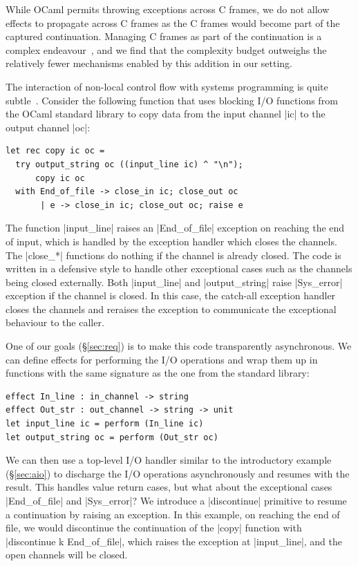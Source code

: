 \documentclass[sigplan,10pt,review,anonymous]{acmart}\settopmatter{printfolios=true,printccs=false,printacmref=false}
\begin{document}
While OCaml permits throwing exceptions across C frames, we do not allow
effects to propagate across C frames as the C frames would become part of the
captured continuation. Managing C frames as part of the continuation is a
complex endeavour~\cite{Leijen17}, and we find that the complexity budget
outweighs the relatively fewer mechanisms enabled by this addition in our
setting.

The interaction of non-local control flow with systems programming is quite
subtle~\cite{TFP17}. Consider the following function that uses blocking I/O
functions from the OCaml standard library to copy data from the input channel
|ic| to the output channel |oc|:
\begin{lstlisting}
let rec copy ic oc =
  try output_string oc ((input_line ic) ^ "\n");
      copy ic oc
  with End_of_file -> close_in ic; close_out oc
	   | e -> close_in ic; close_out oc; raise e
\end{lstlisting}
The function |input_line| raises an |End_of_file| exception on reaching the end
of input, which is handled by the exception handler which closes the channels.
The |close_*| functions do nothing if the channel is already closed. The code
is written in a defensive style to handle other exceptional cases such as the
channels being closed externally. Both |input_line| and |output_string| raise
|Sys_error| exception if the channel is closed. In this case, the catch-all
exception handler closes the channels and reraises the exception to communicate
the exceptional behaviour to the caller.

One of our goals (\S\ref{sec:req}) is to make this code transparently
asynchronous. We can define effects for performing the I/O operations and wrap
them up in functions with the same signature as the one from the standard
library:
\begin{lstlisting}
effect In_line : in_channel -> string
effect Out_str : out_channel -> string -> unit
let input_line ic = perform (In_line ic)
let output_string oc = perform (Out_str oc)
\end{lstlisting}

We can then use a top-level I/O handler similar to the introductory example
(\S\ref{sec:aio}) to discharge the I/O operations asynchronously and resumes
with the result. This handles value return cases, but what about the
exceptional cases |End_of_file| and |Sys_error|? We introduce a |discontinue|
primitive to resume a continuation by raising an exception. In this example, on
reaching the end of file, we would discontinue the continuation of the |copy|
function with |discontinue k End_of_file|, which raises the exception at
|input_line|, and the open channels will be closed.
\end{document}
